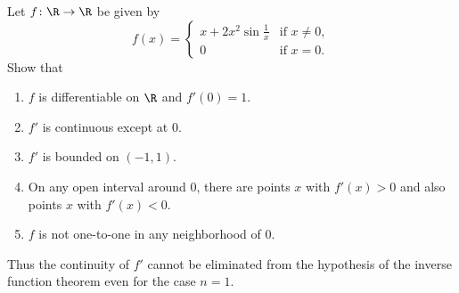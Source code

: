 \documentclass[12pt]{article}
\begin{document}
\setcounter{problem}{13}
\begin{problem}
    Let $f\colon \R \to \R$ be given by \[
        f(x) = \begin{cases}
            x + 2x^2\sin\frac1x & \text{if } x \ne 0, \\
            0 & \text{if } x = 0.
        \end{cases}
    \]
    Show that
    \begin{enumerate}
        \item $f$ is differentiable on $\R$ and $f'(0) = 1$.
        \item $f'$ is continuous except at $0$.
        \item $f'$ is bounded on $(-1, 1)$.
        \item On any open interval around $0$, there are points $x$ with
        $f'(x) > 0$ and also points $x$ with $f'(x) < 0$.
        \item $f$ is not one-to-one in any neighborhood of $0$.
    \end{enumerate}
    Thus the continuity of $f'$ cannot be eliminated from the hypothesis of
    the inverse function theorem even for the case $n = 1$.
\end{problem}
\end{document}
